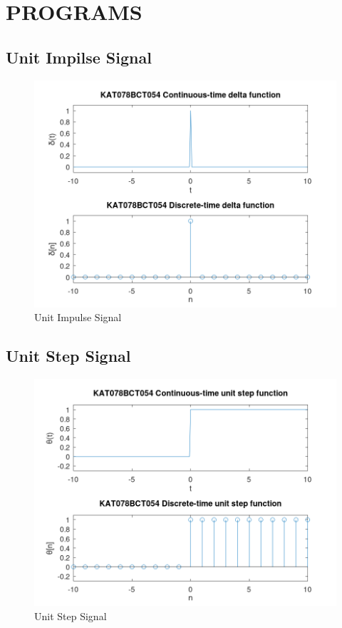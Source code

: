 \section*{\centering PROGRAMS}
\subsection*{Unit Impilse Signal}
    
    \begin{figure}[h]
        \centering
        \includegraphics[width=0.7\linewidth]{figures/unit_impulse.png}
        \caption{Unit Impulse Signal}
        \label{unit_impulse}
    \end{figure}
\newpage
\subsection*{Unit Step Signal}
    
    \begin{figure}[ht]
        \centering
        \includegraphics[width=0.7\linewidth]{figures/unit_step.png}
        \caption{Unit Step Signal}
        \label{unit_step}
    \end{figure}
\newpage
